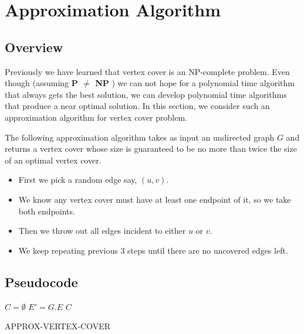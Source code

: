 \documentclass[12pt, a4paper]{article}
\begin{document}
	\section{Approximation Algorithm}
	
	\subsection{Overview}
	Previously we have learned that vertex cover is an NP-complete problem. Even though (assuming \textbf{P $\neq$ NP} ) we
	can not hope for a polynomial time algorithm that always gets the best solution, we can develop
	polynomial time algorithms that produce a near optimal solution. In this section, we
	consider such an approximation algorithm for vertex cover problem. 
	
	
	The following approximation algorithm takes as input an undirected graph $G$ and returns a vertex cover whose size is guaranteed to be no more than twice the size
	of an optimal vertex cover.
	\begin{itemize}
		\item First we pick a random edge say,  ${\left(u,v\right)}$.
		\item We know any vertex cover must have at least one endpoint
		of it, so we take both endpoints.
		\item Then we throw out all edges incident to either ${u}$ or ${v}$.
		\item We keep repeating previous 3 steps
		until there are no uncovered edges left.
	\end{itemize}
	
	\subsection{Pseudocode}
	\begin{algorithm}[H]
		\SetAlgoLined
		\DontPrintSemicolon
		${C = \emptyset}$\;
		${E' = G.E}$\;
		\Return ${C}$\;
		\caption{APPROX-VERTEX-COVER}
	\end{algorithm}
	
\end{document}

